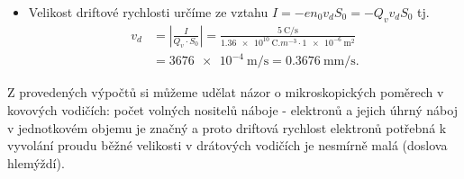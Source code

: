 \begin{mdframed}[style=mdexam]
\begin{example}
\begin{itemize}[leftmargin=2em]
    \item Velikost driftové rychlosti určíme ze vztahu $I = -en_0v_dS_0 = - Q_v v_d S_0$ tj.
    \begin{align*}
      v_d &= \left\lvert\frac{I}{Q_v\cdot S_0}\right\rvert                       
           = \frac{\qty{5}{\coulomb\per\s}}{\qty{1.36e10}{\coulomb.m^{-3}}\cdot\qty{1e-6}{\m^2}}   \\
          &= \qty{3676e-4}{\m\per\s} = \qty{0.3676}{\mm\per\s}.  
    \end{align*}
  \end{itemize}
  Z provedených výpočtů si můžeme udělat názor o mikroskopických poměrech v kovových vodičích: počet
  volných nositelů náboje - elektronů a jejich úhrný náboj v jednotkovém objemu je značný a proto
  driftová rychlost elektronů potřebná k vyvolání proudu běžné velikosti v drátových vodičích je
  nesmírně malá (doslova hlemýždí).
\end{example}  
\end{mdframed}
